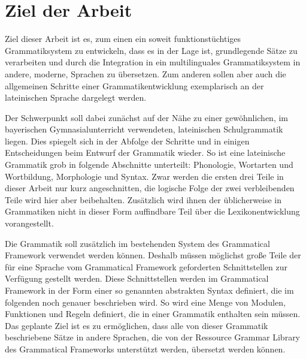 \section{Ziel der Arbeit}
\label{sec:ziel}
Ziel dieser Arbeit ist es, zum einen ein soweit funktionstüchtiges Grammatiksystem zu entwickeln, dass es in der Lage ist, grundlegende Sätze zu verarbeiten und durch die Integration in ein multilinguales Grammatiksystem in andere, moderne, Sprachen zu übersetzen. Zum anderen sollen aber auch die allgemeinen Schritte einer Grammatikentwicklung exemplarisch an der lateinischen Sprache dargelegt werden. \par
Der Schwerpunkt soll dabei zunächst auf der Nähe zu einer gewöhnlichen, im bayerischen Gymnasialunterricht verwendeten, lateinischen Schulgrammatik liegen. Dies spiegelt sich in der Abfolge der Schritte und in einigen Entscheidungen beim Entwurf der Grammatik wieder. So ist eine lateinische Grammatik grob in folgende Abschnitte unterteilt: Phonologie, Wortarten und Wortbildung, Morphologie und Syntax. Zwar werden die ersten drei Teile in dieser Arbeit nur kurz angeschnitten, die logische Folge der zwei verbleibenden Teile wird hier aber beibehalten. Zusätzlich wird ihnen der üblicherweise in Grammatiken nicht in dieser Form auffindbare Teil über die Lexikonentwicklung vorangestellt. \par
Die Grammatik soll zusätzlich im bestehenden System des Grammatical Framework verwendet werden können. Deshalb müssen möglichst große Teile der für eine Sprache vom Grammatical Framework geforderten Schnittstellen zur Verfügung gestellt werden. Diese Schnittstellen werden im Grammatical Framework in der Form einer so genannten abstrakten Syntax definiert, die im folgenden noch genauer beschrieben wird. So wird eine Menge von Modulen, Funktionen und Regeln definiert, die in einer Grammatik enthalten sein müssen. Das geplante Ziel ist es zu ermöglichen, dass alle von dieser Grammatik beschriebene Sätze in andere Sprachen, die von der Ressource Grammar Library des Grammatical Frameworks unterstützt werden, übersetzt werden können.
\pagebreak
